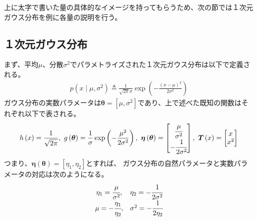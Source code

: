 \documentclass[oneside,onecolumn]{jlreq}
\theoremstyle{plain}
\begin{document}
上に太字で書いた量の具体的なイメージを持ってもらうため、次の節では１次元ガウス分布を例に各量の説明を行う。
\subsection{１次元ガウス分布}
まず、平均$\mu$、分散$\sigma^2$でパラメトライズされた１次元ガウス分布は以下で定義される。
\begin{align}
    p\left(x\mid \mu, \sigma^2\right) \triangleq \frac{1}{\sqrt{2\pi}\sigma}\exp\left(-\frac{(x-\mu)^2}{2\sigma^2}\right)
\end{align}
ガウス分布の実数パラメータは$\bm{\theta} = \left[\mu, \sigma^2\right]$であり、上で述べた既知の関数はそれぞれ以下で表される。
\begin{align}
    h\left(x\right) = \frac{1}{\sqrt{2\pi}},
    ~g\left(\bm{\theta}\right) = \frac{1}{\sigma}\exp\left(-\frac{\mu^2}{2\sigma^2}\right),
    ~\bm{\eta}\left(\bm{\theta}\right) =
    \begin{bmatrix}
        \cfrac{\mu}{\sigma^2} \\
        -\cfrac{1}{2\sigma^2}
    \end{bmatrix},
    ~\bm{T}\left(x\right) =
    \begin{bmatrix}
        x \\
        x^2
    \end{bmatrix}
\end{align}
つまり、$\bm{\eta}\left(\bm{\theta}\right)=\left[\eta_1, \eta_2\right]$とすれば、
ガウス分布の自然パラメータと実数パラメータの対応は次のようになる。
\begin{align}
    \begin{matrix}
        \eta_1 = \cfrac{\mu}{\sigma^2}, & \eta_2 = -\cfrac{1}{2\sigma^2} \\
        \mu = -\cfrac{\eta_1}{\eta_2}, & \sigma^2 = -\cfrac{1}{2\eta_2}
    \end{matrix}
\end{align}
\end{document}
